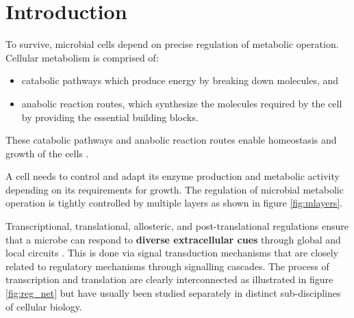 \documentclass[12pt,chapterheads]{ucsd}
\begin{document}
%







%   
%   
%


\chapter{Introduction}
To survive, microbial cells depend on precise regulation of metabolic operation. Cellular metabolism is comprised of: 
\begin{itemize}
    \item catabolic pathways which produce energy by breaking down molecules, and
    \item anabolic reaction routes, which synthesize the molecules required by the cell by providing the essential building blocks. 
\end{itemize}
These catabolic pathways and anabolic reaction routes enable homeostasis and growth of the cells \cite{C3MB25489E}.

A cell needs to control and adapt its enzyme production and metabolic activity depending on its requirements for growth. The regulation of microbial metabolic operation is tightly controlled by multiple layers \cite{Kotte2010} as shown in figure \ref{fig:mlayers}.

Transcriptional, translational, allosteric, and post-translational regulations ensure that a microbe can respond to \textbf{diverse extracellular cues} through global and local circuits \cite{Chubukov2014}. This is done via signal transduction mechanisms that are closely related to regulatory mechanisms through signalling cascades. The process of transcription and translation are clearly interconnected as illustrated in figure \ref{fig:reg_net} but have usually been studied separately in distinct sub-disciplines of cellular biology.
\end{document}
